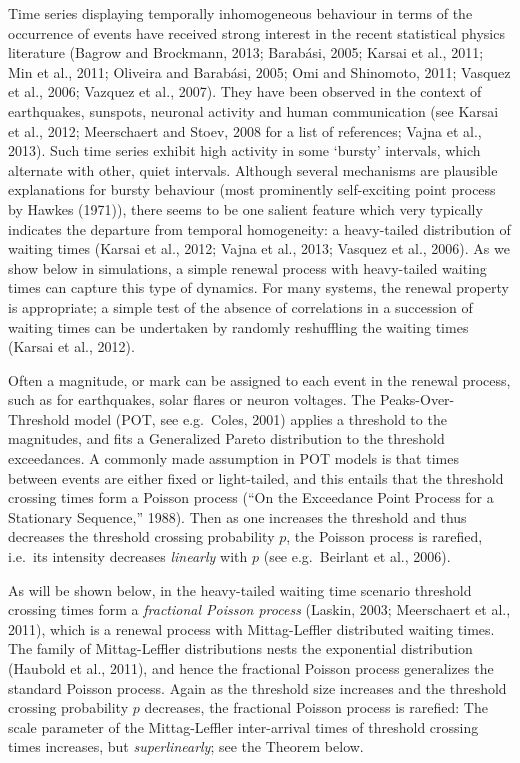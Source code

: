\documentclass[]{elsarticle} %
\begin{document}
Time series displaying temporally inhomogeneous behaviour in terms of
the occurrence of events have received strong interest in the recent
statistical physics literature (Bagrow and Brockmann, 2013; Barabási,
2005; Karsai et al., 2011; Min et al., 2011; Oliveira and Barabási,
2005; Omi and Shinomoto, 2011; Vasquez et al., 2006; Vazquez et al.,
2007). They have been observed in the context of earthquakes, sunspots,
neuronal activity and human communication (see Karsai et al., 2012;
Meerschaert and Stoev, 2008 for a list of references; Vajna et al.,
2013). Such time series exhibit high activity in some `bursty'
intervals, which alternate with other, quiet intervals. Although several
mechanisms are plausible explanations for bursty behaviour (most
prominently self-exciting point process by Hawkes (1971)), there seems
to be one salient feature which very typically indicates the departure
from temporal homogeneity: a heavy-tailed distribution of waiting times
(Karsai et al., 2012; Vajna et al., 2013; Vasquez et al., 2006). As we
show below in simulations, a simple renewal process with heavy-tailed
waiting times can capture this type of dynamics. For many systems, the
renewal property is appropriate; a simple test of the absence of
correlations in a succession of waiting times can be undertaken by
randomly reshuffling the waiting times (Karsai et al., 2012).

Often a magnitude, or mark can be assigned to each event in the renewal
process, such as for earthquakes, solar flares or neuron voltages. The
Peaks-Over-Threshold model (POT, see e.g.~Coles, 2001) applies a
threshold to the magnitudes, and fits a Generalized Pareto distribution
to the threshold exceedances. A commonly made assumption in POT models
is that times between events are either fixed or light-tailed, and this
entails that the threshold crossing times form a Poisson process (``On
the Exceedance Point Process for a Stationary Sequence,'' 1988). Then as
one increases the threshold and thus decreases the threshold crossing
probability \(p\), the Poisson process is rarefied, i.e.~its intensity
decreases \emph{linearly} with \(p\) (see e.g.~Beirlant et al., 2006).

As will be shown below, in the heavy-tailed waiting time scenario
threshold crossing times form a \emph{fractional Poisson process}
(Laskin, 2003; Meerschaert et al., 2011), which is a renewal process
with Mittag-Leffler distributed waiting times. The family of
Mittag-Leffler distributions nests the exponential distribution (Haubold
et al., 2011), and hence the fractional Poisson process generalizes the
standard Poisson process. Again as the threshold size increases and the
threshold crossing probability \(p\) decreases, the fractional Poisson
process is rarefied: The scale parameter of the Mittag-Leffler
inter-arrival times of threshold crossing times increases, but
\emph{superlinearly}; see the Theorem below.
\end{document}
